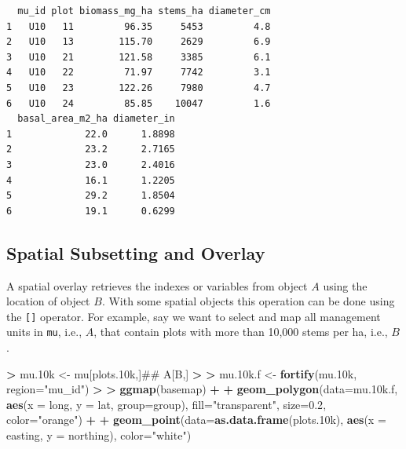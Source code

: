 \documentclass[]{krantz}
\makeatletter
\newenvironment{Shaded}{\begin{snugshade}}{\end{snugshade}}
\newcommand{\KeywordTok}[1]{\textcolor[rgb]{0.27,0.27,0.27}{\textbf{#1}}}
\newcommand{\DataTypeTok}[1]{\textcolor[rgb]{0.27,0.27,0.27}{#1}}
\newcommand{\FloatTok}[1]{\textcolor[rgb]{0.06,0.06,0.06}{#1}}
\newcommand{\StringTok}[1]{\textcolor[rgb]{0.5,0.5,0.5}{#1}}
\newcommand{\OperatorTok}[1]{\textcolor[rgb]{0.43,0.43,0.43}{\textbf{#1}}}
\newcommand{\ErrorTok}[1]{\textcolor[rgb]{0.14,0.14,0.14}{\textbf{#1}}}
\newcommand{\NormalTok}[1]{#1}
\newenvironment{kframe}{%
\medskip{}
\setlength{\fboxsep}{.8em}
 \def\at@end@of@kframe{}%
 \ifinner\ifhmode%
  \def\at@end@of@kframe{\end{minipage}}%
  \begin{minipage}{\columnwidth}%
 \fi\fi%
 \def\FrameCommand##1{\hskip\@totalleftmargin \hskip-\fboxsep
 \colorbox{shadecolor}{##1}\hskip-\fboxsep
     \hskip-\linewidth \hskip-\@totalleftmargin \hskip\columnwidth}%
 \MakeFramed {\advance\hsize-\width
   \@totalleftmargin\z@ \linewidth\hsize
   \@setminipage}}%
 {\par\unskip\endMakeFramed%
 \at@end@of@kframe}
\renewenvironment{Shaded}{\begin{kframe}}{\end{kframe}}
\makeatother
\begin{document}
\begin{verbatim}
  mu_id plot biomass_mg_ha stems_ha diameter_cm
1   U10   11         96.35     5453         4.8
2   U10   13        115.70     2629         6.9
3   U10   21        121.58     3385         6.1
4   U10   22         71.97     7742         3.1
5   U10   23        122.26     7980         4.7
6   U10   24         85.85    10047         1.6
  basal_area_m2_ha diameter_in
1             22.0      1.8898
2             23.2      2.7165
3             23.0      2.4016
4             16.1      1.2205
5             29.2      1.8504
6             19.1      0.6299
\end{verbatim}

\subsection{Spatial Subsetting and
Overlay}\label{spatial-subsetting-and-overlay}

A spatial overlay retrieves the indexes or variables from object \(A\)
using the location of object \(B\). With some spatial objects this
operation can be done using the \texttt{{[}{]}} operator. For example,
say we want to select and map all management units in \texttt{mu}, i.e.,
\(A\), that contain plots with more than 10,000 stems per ha, i.e.,
\(B\).

\begin{Shaded}
\begin{Highlighting}[]
\OperatorTok{>}\StringTok{ }\NormalTok{mu.10k <-}\StringTok{ }\NormalTok{mu[plots.10k,]## A[B,]}
\OperatorTok{>}\StringTok{ }
\ErrorTok{>}\StringTok{ }\NormalTok{mu.10k.f <-}\StringTok{ }\KeywordTok{fortify}\NormalTok{(mu.10k, }\DataTypeTok{region=}\StringTok{"mu_id"}\NormalTok{)}
\OperatorTok{>}\StringTok{ }
\ErrorTok{>}\StringTok{ }\KeywordTok{ggmap}\NormalTok{(basemap) }\OperatorTok{+}
\OperatorTok{+}\StringTok{     }\KeywordTok{geom_polygon}\NormalTok{(}\DataTypeTok{data=}\NormalTok{mu.10k.f, }\KeywordTok{aes}\NormalTok{(}\DataTypeTok{x =}\NormalTok{ long, }\DataTypeTok{y =}\NormalTok{ lat, }\DataTypeTok{group=}\NormalTok{group), }\DataTypeTok{fill=}\StringTok{"transparent"}\NormalTok{, }\DataTypeTok{size=}\FloatTok{0.2}\NormalTok{, }\DataTypeTok{color=}\StringTok{"orange"}\NormalTok{) }\OperatorTok{+}
\OperatorTok{+}\StringTok{     }\KeywordTok{geom_point}\NormalTok{(}\DataTypeTok{data=}\KeywordTok{as.data.frame}\NormalTok{(plots.10k), }\KeywordTok{aes}\NormalTok{(}\DataTypeTok{x =}\NormalTok{ easting, }\DataTypeTok{y =}\NormalTok{ northing), }\DataTypeTok{color=}\StringTok{"white"}\NormalTok{)}
\end{Highlighting}
\end{Shaded}
\end{document}
